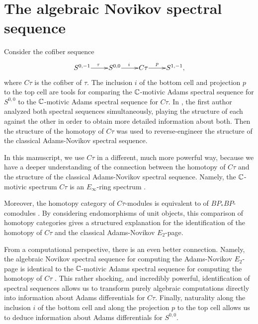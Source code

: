 \chapter{The algebraic Novikov spectral sequence}
\label{ch:AANSS}

Consider the cofiber sequence
\[
\xymatrix@1{
S^{0,-1} \ar[r]^\tau & S^{0,0} \ar[r]^i & C\tau \ar[r]^-p & S^{1,-1},
}
\]
where $C\tau$ is the cofiber of $\tau$.
The inclusion $i$ of the bottom cell and projection $p$ to the top cell
are tools for comparing the $\mathbb{C}$-motivic Adams spectral sequence
for $S^{0,0}$ to the $\mathbb{C}$-motivic Adams spectral sequence for
$C\tau$.
In \cite{Isaksen14c}, the first author analyzed both spectral sequences simultaneously,
playing the structure of each against the other in order to obtain
more detailed information about both.
Then the structure of the homotopy of $C\tau$ was used
to reverse-engineer the structure of the classical Adams-Novikov spectral
sequence.

In this manuscript, we use $C\tau$ in a different, much more powerful
way, because we have a deeper understanding of the connection
between the homotopy of $C\tau$ and the structure of the
classical Adams-Novikov spectral sequence.
Namely, the $\mathbb{C}$-motivic spectrum $C\tau$ is an $E_\infty$-ring spectrum
\cite{Gheorghe18}.

Moreover, 
the homotopy category of $C\tau$-modules is equivalent
to  of $BP_*BP$-comodules  \cite{GWX18} \cite{Krause18}.
By considering endomorphisms of unit objects, this comparison
of homotopy categories gives a structured explanation for the
identification of the homotopy of $C\tau$ and the
classical Adams-Novikov $E_2$-page.

From a computational perspective, there is an even better connection.
Namely, the algebraic Novikov spectral sequence for computing
the Adams-Novikov $E_2$-page 
\cite{Novikov67} \cite{Miller75} 
is identical to the $\mathbb{C}$-motivic Adams
spectral sequence for computing the homotopy of $C\tau$ \cite{GWX18}.
This rather shocking, and incredibly powerful, 
identification of spectral sequences allows us to transform
purely algebraic computations directly into information about
Adams differentials for $C\tau$.
Finally, naturality along the inclusion $i$ of the bottom cell
and along the projection $p$ to the top cell allows us to
deduce information about Adams differentials for $S^{0,0}$.

